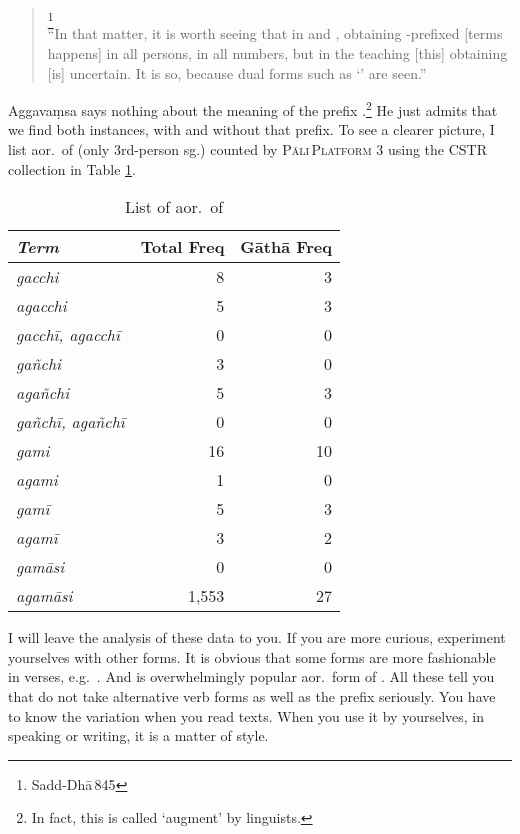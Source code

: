 \begin{quote}
\footnote{Sadd-Dh\=a\,845}\\
``In that matter, it is worth seeing that in  and , obtaining -prefixed [terms happens] in all persons, in all numbers, but in the teaching [this] obtaining [is] uncertain. It is so, because dual forms such as `' are seen.''
\end{quote}

Aggava\d msa says nothing about the meaning of the prefix .\footnote{In fact, this is called `augment' by linguists.} He just admits that we find both instances, with and without that prefix. To see a clearer picture, I list aor.\ of  (only 3rd-person sg.) counted by \textsc{P\=ali\,Platform} 3 using the CSTR collection in Table \ref{tab:gacchi}.

\begin{table}[!hbt]
\centering
\caption{List of aor.\ of }
\label{tab:gacchi}
\bigskip
\begin{tabular}{>{\itshape}lrr} \toprule
Term & Total Freq & G\=ath\=a Freq \\ 
\midrule
gacchi & 8 & 3 \\
agacchi & 5 & 3 \\
gacch\=i, agacch\=i & 0 & 0 \\
ga\~nchi & 3 & 0 \\
aga\~nchi & 5 & 3 \\
ga\~nch\=i, aga\~nch\=i & 0 & 0 \\
gami & 16 & 10 \\
agami & 1 & 0 \\
gam\=i & 5 & 3 \\
agam\=i & 3 & 2 \\
gam\=asi & 0 & 0 \\
agam\=asi & 1,553 & 27 \\
\bottomrule
\end{tabular}
\end{table}

I will leave the analysis of these data to you. If you are more curious, experiment yourselves with other forms. It is obvious that some forms are more fashionable in verses, e.g.\ . And  is overwhelmingly popular aor.\ form of . All these tell you that do not take alternative verb forms as well as the prefix  seriously. You have to know the variation when you read texts. When you use it by yourselves, in speaking or writing, it is a matter of style.

